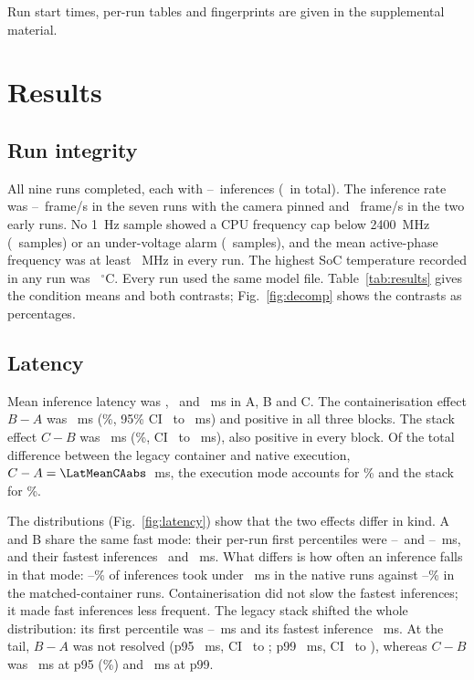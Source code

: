 \documentclass[10pt,journal,compsoc]{IEEEtran}
\begin{document}
Run start times, per-run tables and fingerprints are given in the supplemental material.

\section{Results}\label{sec:results}

\subsection{Run integrity}
All nine runs completed, each with \TotFramesMin--\TotFramesMax\ inferences (\FramesAll\ in total). The inference rate was \FPSPinnedMin--\FPSPinnedMax~frame/s in the seven runs with the camera pinned and \FPSEarlyMin~frame/s in the two early runs. No 1~Hz sample showed a CPU frequency cap below 2400~MHz (\CapSamples\ samples) or an under-voltage alarm (\UVSamples\ samples), and the mean active-phase frequency was at least \MHzMin~MHz in every run. The highest SoC temperature recorded in any run was \TMaxAll~$^\circ$C. Every run used the same model file. Table~\ref{tab:results} gives the condition means and both contrasts; Fig.~\ref{fig:decomp} shows the contrasts as percentages.



\subsection{Latency}
Mean inference latency was \LatMeanA, \LatMeanB\ and \LatMeanC~ms in A, B and C. The containerisation effect $B-A$ was \LatMeanBAabs~ms (\LatMeanBApctabs\%, 95\% CI \LatMeanBAlo\ to \LatMeanBAhi~ms) and positive in all three blocks. The stack effect $C-B$ was \LatMeanCBabs~ms (\LatMeanCBpctabs\%, CI \LatMeanCBlo\ to \LatMeanCBhi~ms), also positive in every block. Of the total difference between the legacy container and native execution, $C-A=\LatMeanCAabs$~ms, the execution mode accounts for \ShareContainer\% and the stack for \ShareStack\%.

The distributions (Fig.~\ref{fig:latency}) show that the two effects differ in kind. A and B share the same fast mode: their per-run first percentiles were \PoneAlo--\PoneAhi\ and \PoneBlo--\PoneBhi~ms, and their fastest inferences \LatMinA\ and \LatMinB~ms. What differs is how often an inference falls in that mode: \FastAlo--\FastAhi\% of inferences took under \FastMs~ms in the native runs against \FastBlo--\FastBhi\% in the matched-container runs. Containerisation did not slow the fastest inferences; it made fast inferences less frequent. The legacy stack shifted the whole distribution: its first percentile was \PoneClo--\PoneChi~ms and its fastest inference \LatMinC~ms. At the tail, $B-A$ was not resolved (p95 \LatPninetyfiveBA~ms, CI \LatPninetyfiveBAlo\ to \LatPninetyfiveBAhi; p99 \LatPninetynineBA~ms, CI \LatPninetynineBAlo\ to \LatPninetynineBAhi), whereas $C-B$ was \LatPninetyfiveCBabs~ms at p95 (\LatPninetyfiveCBpctabs\%) and \LatPninetynineCBabs~ms at p99.
\end{document}
